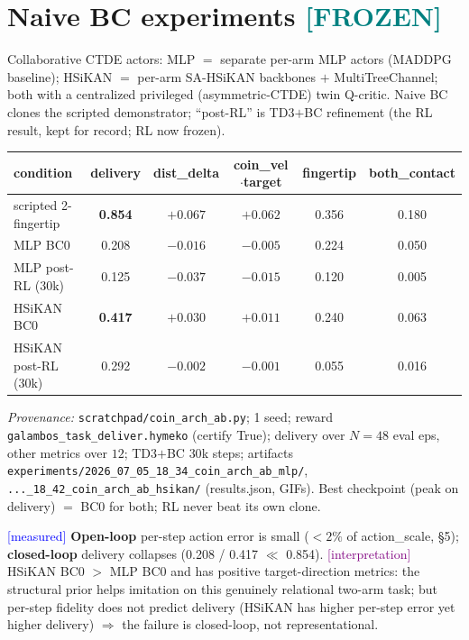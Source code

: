 \documentclass[11pt]{article}
\newcommand{\meas}{\textcolor{blue}{[measured]}}
\newcommand{\interp}{\textcolor{purple}{[interpretation]}}
\newcommand{\frozen}{\textcolor{teal}{\textbf{[FROZEN]}}}
\newcommand{\fn}[1]{\texttt{#1}}
\begin{document}
\section{Naive BC experiments \frozen}
Collaborative CTDE actors: MLP $=$ separate per-arm MLP actors (MADDPG baseline); HSiKAN $=$ per-arm SA-HSiKAN
backbones $+$ MultiTreeChannel; both with a centralized privileged (asymmetric-CTDE) twin Q-critic. Naive BC clones
the scripted demonstrator; ``post-RL'' is TD3$+$BC refinement (the RL result, kept for record; RL now frozen).

\begin{center}\begin{tabular}{lccccc}
\toprule
condition & delivery & dist\_delta & coin\_vel$\cdot$target & fingertip & both\_contact\\
\midrule
scripted 2-fingertip & \textbf{0.854} & $+0.067$ & $+0.062$ & 0.356 & 0.180\\
MLP BC0 & 0.208 & $-0.016$ & $-0.005$ & 0.224 & 0.050\\
MLP post-RL (30k) & 0.125 & $-0.037$ & $-0.015$ & 0.120 & 0.005\\
HSiKAN BC0 & \textbf{0.417} & $+0.030$ & $+0.011$ & 0.240 & 0.063\\
HSiKAN post-RL (30k) & 0.292 & $-0.002$ & $-0.001$ & 0.055 & 0.016\\
\bottomrule
\end{tabular}\end{center}
\emph{Provenance:} \fn{scratchpad/coin\_arch\_ab.py}; 1 seed; reward \fn{galambos\_task\_deliver.hymeko}
(certify True); delivery over $N=48$ eval eps, other metrics over $12$; TD3$+$BC $30$k steps; artifacts
\fn{experiments/2026\_07\_05\_18\_34\_coin\_arch\_ab\_mlp/}, \fn{...\_18\_42\_coin\_arch\_ab\_hsikan/} (results.json,
GIFs). Best checkpoint (peak on delivery) $=$ BC0 for both; RL never beat its own clone.

\meas{} \textbf{Open-loop} per-step action error is small ($<2\%$ of action\_scale, \S5); \textbf{closed-loop}
delivery collapses (0.208 / 0.417 $\ll$ 0.854). \interp{} HSiKAN BC0 $>$ MLP BC0 and has positive target-direction
metrics: the structural prior helps imitation on this genuinely relational two-arm task; but per-step fidelity
does not predict delivery (HSiKAN has higher per-step error yet higher delivery) $\Rightarrow$ the failure is
closed-loop, not representational.

\end{document}
